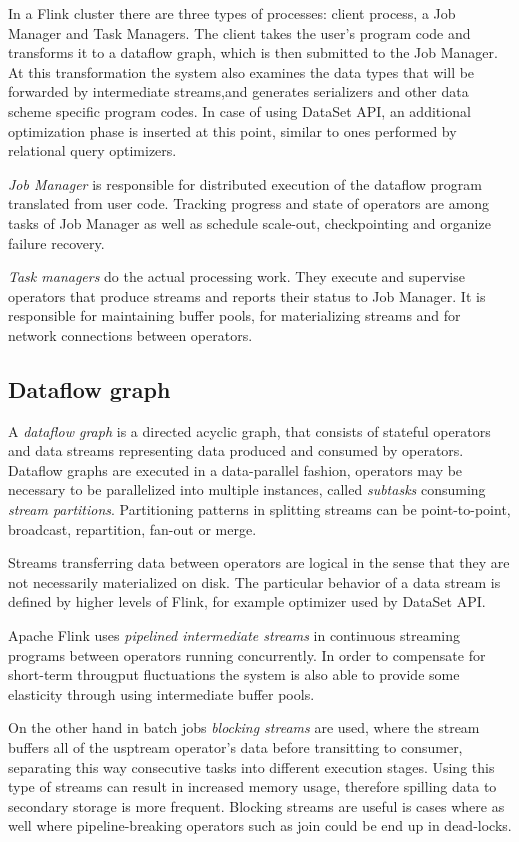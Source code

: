 In a Flink cluster there are three types of processes: client process, a Job Manager and Task Managers. The client takes the user's program code and transforms it to a dataflow graph, which is then submitted to the Job Manager. At this transformation the system also examines the data types that will be forwarded by intermediate streams,and generates serializers and other data scheme specific program codes. In case of using DataSet API, an additional optimization phase is inserted at this point, similar to ones performed by relational query optimizers.

\textit{Job Manager} is responsible for distributed execution of the dataflow program translated from user code. Tracking progress and state of operators are among tasks of Job Manager as well as schedule scale-out, checkpointing and organize failure recovery.

\textit{Task managers} do the actual processing work. They execute and supervise operators that produce streams and reports their status to Job Manager. It is responsible for maintaining buffer pools, for materializing streams and for network connections between operators.   

\subsection{Dataflow graph}
A  \textit{dataflow graph} is a directed acyclic graph, that consists of stateful operators and data streams representing data produced and consumed by operators.
Dataflow graphs are executed in a data-parallel fashion, operators may be necessary to be parallelized into multiple instances, called \textit{subtasks} consuming \textit{stream partitions}. Partitioning patterns in splitting streams can be point-to-point, broadcast, repartition, fan-out or merge.

Streams transferring data between operators are logical in the sense that they are not necessarily materialized on disk. The particular behavior of a data stream is defined by higher levels of Flink, for example optimizer used by DataSet API.

Apache Flink uses \textit{pipelined intermediate streams} in continuous streaming programs between operators running concurrently. In order to compensate for short-term througput fluctuations the system is also able to provide some elasticity through using intermediate buffer pools.  

On the other hand in batch jobs \textit{blocking streams} are used, where the stream buffers all of the usptream operator's data before transitting to consumer, separating this way consecutive tasks into different execution stages. Using 
 this type of streams can result in increased memory usage, therefore spilling data to secondary storage is more frequent. Blocking streams are useful is cases where as well where pipeline-breaking operators such as join\cite{distributedjoin} could be end up in dead-locks.

